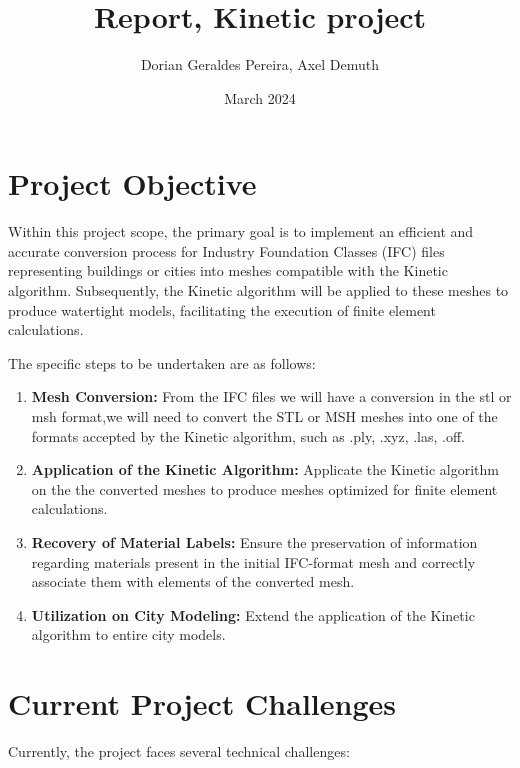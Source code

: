 \documentclass{article}
\title{Report, Kinetic project}
\author{Dorian Geraldes Pereira, Axel Demuth}
\date{March 2024}
\begin{document}
\maketitle
\tableofcontents
\newpage
\section{Project Objective}

Within this project scope, the primary goal is to implement an efficient and accurate 
conversion process for Industry Foundation Classes (IFC) 
files representing buildings or cities into meshes compatible with the 
Kinetic algorithm. Subsequently, the Kinetic algorithm will be applied to these 
meshes to produce watertight models, facilitating the execution of finite element calculations.

The specific steps to be undertaken are as follows:

\begin{enumerate}   
    \item \textbf{Mesh Conversion:} From the IFC files we will have a 
    conversion in the stl or msh format,we will need to convert the STL 
    or MSH meshes into one of the formats accepted by the Kinetic algorithm, 
    such as .ply, .xyz, .las, .off.
    
    \item \textbf{Application of the Kinetic Algorithm:} Applicate  
    the Kinetic algorithm on the the converted 
    meshes to produce meshes optimized for finite element calculations.
    
    \item \textbf{Recovery of Material Labels:} Ensure the preservation 
    of information regarding materials present in the initial IFC-format mesh 
    and correctly associate them with elements of the converted mesh.
    
    \item \textbf{Utilization on City Modeling:} Extend the application of 
    the Kinetic algorithm to entire city models.
\end{enumerate}

\section{Current Project Challenges}

Currently, the project faces several technical challenges:
\end{document}
